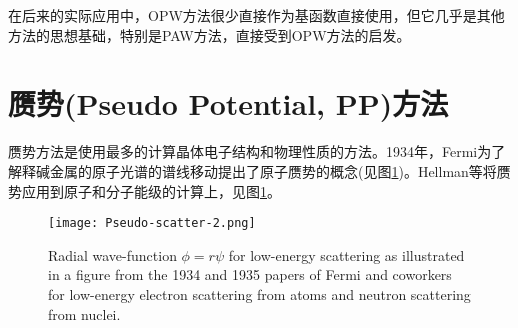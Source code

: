 在后来的实际应用中，OPW方法很少直接作为基函数直接使用，但它几乎是其他方法的思想基础，特别是PAW方法，直接受到OPW方法的启发。

\section{赝势(Pseudo Potential, PP)方法}
赝势方法是使用最多的计算晶体电子结构和物理性质的方法。1934年，Fermi为了解释碱金属的原子光谱的谱线移动提出了原子赝势的概念(见图\ref{Pseudo-scatter-2})\cite{nc11-157_1934,ajp52-695_1984}。Hellman等将赝势应用到原子和分子能级的计算上\cite{jcp3-61_1935}，见图\ref{Pseudo-scatter-2}。
\begin{figure}[h!]
\centering
\vspace*{-0.25in}
\texttt{[image: Pseudo-scatter-2.png]}
\caption{{\textrm{Radial wave-function $\phi=r\psi$ for low-energy scattering as illustrated in a figure from the 1934 and 1935 papers of Fermi and coworkers for low-energy electron scattering from atoms and neutron scattering from nuclei.}}}%
\label{Pseudo-scatter-2}
\end{figure}

